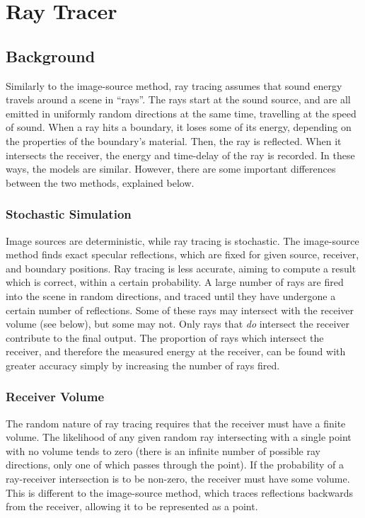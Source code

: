 \documentclass[]{scrreprt}
\begin{document}
\chapter{Ray Tracer}\label{ray-tracer}

\section{Background}\label{background-1}

Similarly to the image-source method, ray tracing assumes that sound
energy travels around a scene in ``rays''. The rays start at the sound
source, and are all emitted in uniformly random directions at the same
time, travelling at the speed of sound. When a ray hits a boundary, it
loses some of its energy, depending on the properties of the boundary's
material. Then, the ray is reflected. When it intersects the receiver,
the energy and time-delay of the ray is recorded. In these ways, the
models are similar. However, there are some important differences
between the two methods, explained below.

\subsection{Stochastic Simulation}\label{stochastic-simulation}

Image sources are deterministic, while ray tracing is stochastic. The
image-source method finds exact specular reflections, which are fixed
for given source, receiver, and boundary positions. Ray tracing is less
accurate, aiming to compute a result which is correct, within a certain
probability. A large number of rays are fired into the scene in random
directions, and traced until they have undergone a certain number of
reflections. Some of these rays may intersect with the receiver volume
(see below), but some may not. Only rays that \emph{do} intersect the
receiver contribute to the final output. The proportion of rays which
intersect the receiver, and therefore the measured energy at the
receiver, can be found with greater accuracy simply by increasing the
number of rays fired.

\subsection{Receiver Volume}\label{receiver-volume}

The random nature of ray tracing requires that the receiver must have a
finite volume. The likelihood of any given random ray intersecting with
a single point with no volume tends to zero (there is an infinite number
of possible ray directions, only one of which passes through the point).
If the probability of a ray-receiver intersection is to be non-zero, the
receiver must have some volume. This is different to the image-source
method, which traces reflections backwards from the receiver, allowing
it to be represented as a point.
\end{document}
